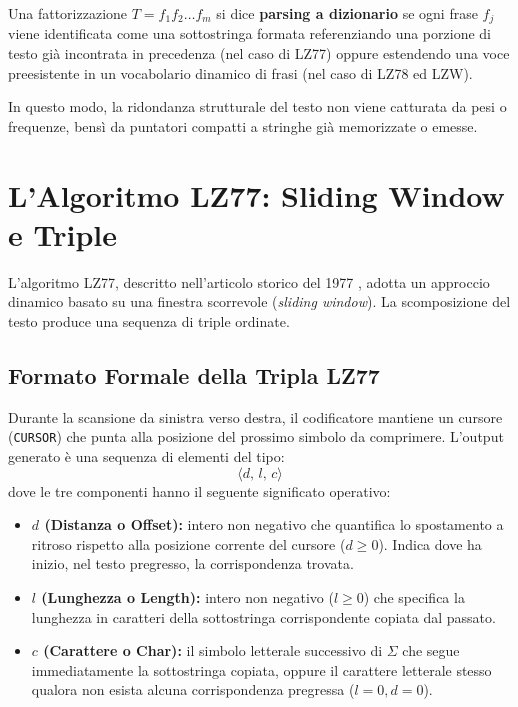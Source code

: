 \begin{definition}
Una fattorizzazione $T = f_1 f_2 \dots f_m$ si dice \textbf{parsing a dizionario} se ogni frase $f_j$ viene identificata come una sottostringa formata referenziando una porzione di testo gi\`a incontrata in precedenza (nel caso di LZ77) oppure estendendo una voce preesistente in un vocabolario dinamico di frasi (nel caso di LZ78 ed LZW).
\end{definition}

In questo modo, la ridondanza strutturale del testo non viene catturata da pesi o frequenze, bens\`i da puntatori compatti a stringhe gi\`a memorizzate o emesse.

\FloatBarrier
\section{L'Algoritmo LZ77: Sliding Window e Triple}
\label{sec:algoritmo-lz77}

L'algoritmo LZ77, descritto nell'articolo storico del 1977 \cite{ziv1977}, adotta un approccio dinamico basato su una finestra scorrevole (\textit{sliding window}). La scomposizione del testo produce una sequenza di triple ordinate.

\FloatBarrier
\subsection{Formato Formale della Tripla LZ77}
\label{subsec:formato-tripla-lz77}

Durante la scansione da sinistra verso destra, il codificatore mantiene un cursore (\texttt{CURSOR}) che punta alla posizione del prossimo simbolo da comprimere. L'output generato \`e una sequenza di elementi del tipo:
\begin{equation}
  \langle d, \, l, \, c \rangle
\end{equation}
dove le tre componenti hanno il seguente significato operativo:
\begin{itemize}
  \item \textbf{$d$ (Distanza o Offset):} intero non negativo che quantifica lo spostamento a ritroso rispetto alla posizione corrente del cursore ($d \ge 0$). Indica dove ha inizio, nel testo pregresso, la corrispondenza trovata.
  \item \textbf{$l$ (Lunghezza o Length):} intero non negativo ($l \ge 0$) che specifica la lunghezza in caratteri della sottostringa corrispondente copiata dal passato.
  \item \textbf{$c$ (Carattere o Char):} il simbolo letterale successivo di $\Sigma$ che segue immediatamente la sottostringa copiata, oppure il carattere letterale stesso qualora non esista alcuna corrispondenza pregressa ($l = 0, d = 0$).
\end{itemize}

